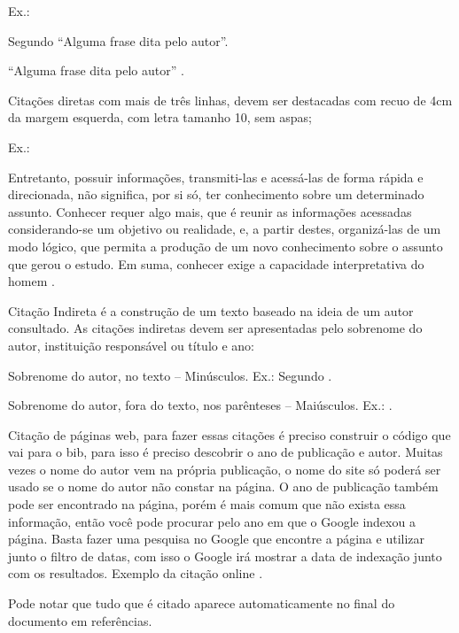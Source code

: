 Ex.:


Segundo  ``Alguma frase dita pelo autor''.

``Alguma frase dita pelo autor'' \cite[p. 15]{hair2009analise}.

Citações diretas com mais de três linhas, devem ser destacadas com recuo de 4cm da margem esquerda, com letra tamanho 10, sem aspas;

Ex.:

\begin{citacao}
Entretanto, possuir informações, transmiti-las e acessá-las de forma rápida e direcionada, não significa, por si só, ter conhecimento sobre um determinado assunto. Conhecer requer algo mais, que é reunir as informações acessadas considerando-se um objetivo ou realidade, e, a partir destes, organizá-las de um modo lógico, que permita a produção de um novo conhecimento sobre o assunto que gerou o estudo. Em suma, conhecer exige a capacidade interpretativa do homem \cite[p. 22]{hair2009analise}.
\end{citacao}

Citação Indireta é a construção de um texto baseado na ideia de um autor consultado. As citações indiretas devem ser apresentadas pelo sobrenome do autor, instituição responsável ou título e ano:

Sobrenome do autor, no texto – Minúsculos.
Ex.: Segundo .

Sobrenome do autor, fora do texto, nos parênteses – Maiúsculos.
Ex.: \cite[p. 20]{paulino2006analise}.

Citação de páginas web, para fazer essas citações é preciso construir o código que vai para o bib, para isso é preciso descobrir o ano de publicação e autor. Muitas vezes o nome do autor vem na própria publicação, o nome do site só poderá ser usado se o nome do autor não constar na página. O ano de publicação também pode ser encontrado na página, porém é mais comum que não exista essa informação, então você pode procurar pelo ano em que o Google indexou a página. Basta fazer uma pesquisa no Google que encontre a página e utilizar junto o filtro de datas, com isso o Google irá mostrar a data de indexação junto com os resultados. Exemplo da citação online \cite{refABNTSite}.


Pode notar que tudo que é citado aparece automaticamente no final do documento em referências.


